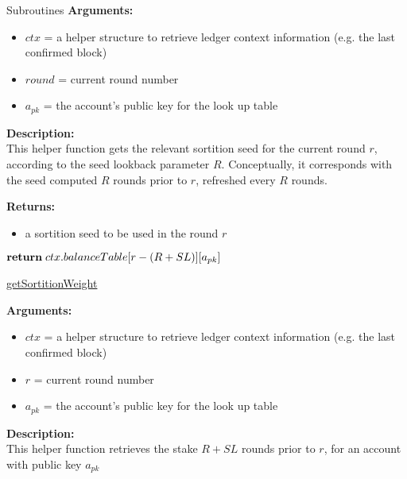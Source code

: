 \documentclass[10pt,a4paper]{article}
\begin{document}
\begin{section}{Subroutines}
\noindent \textbf{Arguments:}
\begin{itemize}
    \item $ctx$ = a helper structure to retrieve ledger context information (e.g. the last confirmed block)
    \item $round$ = current round number
    \item $a_{pk}$ = the account's public key for the look up table
  \end{itemize}


\noindent \textbf{Description:}\\
This helper function gets the relevant sortition seed for the current round $r$, according to the seed lookback parameter $R$.
Conceptually, it corresponds with the seed computed $R$ rounds prior to $r$, refreshed every $R$ rounds.

\noindent \textbf{Returns:}
\begin{itemize}
    \item a sortition seed to be used in the round $r$
  \end{itemize}


\begin{algorithm}[H]\label{algo:get-sortition-weight}
    \begin{algorithmic}[1]

            $\Return\;ctx.balanceTable[r - (R + SL)][a_{pk}]$

        \EndFunction
    \end{algorithmic}
    \caption{\underline{getSortitionWeight}}
\end{algorithm}

\noindent \textbf{Arguments:}
\begin{itemize}
    \item $ctx$ = a helper structure to retrieve ledger context information (e.g. the last confirmed block)
    \item $r$ = current round number
    \item $a_{pk}$ = the account's public key for the look up table
  \end{itemize}


\noindent \textbf{Description:}\\
This helper function retrieves the stake $R + SL$ rounds prior to $r$, for an account
with public key $a_{pk}$


\end{section}
\end{document}
